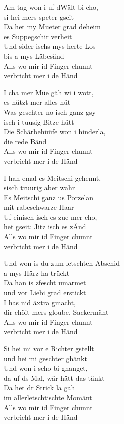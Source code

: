 \documentclass[
  letterpaper,
]{scrbook}
\begin{document}
Am tag won i uf d\textquotesingle Wält bi cho,\\
si hei mers speter gseit\\
Da het my Mueter grad deheim\\
es Suppegschir verheit\\
Und sider ischs mys herte Los\\
bis a mys Läbesänd\\
Alls wo mir id Finger chunnt\\
verbricht mer i de Händ

I cha mer Müe gäh wi i wott,\\
es nützt mer alles nüt\\
Was geschter no isch ganz gsy\\
isch i tuusig Bitze hütt\\
Die Schärbehüüfe won i hinderla,\\
die rede Bänd\\
Alls wo mir id Finger chunnt\\
verbricht mer i de Händ

I han emal es Meitschi gchennt,\\
s\textquotesingle isch truurig aber wahr\\
Es Meitschi ganz us Porzelan\\
mit rabeschwarze Haar\\
Uf einisch isch es zue mer cho,\\
het gseit: Jitz isch es z\textquotesingle Änd\\
Alls wo mir id Finger chunnt\\
verbricht mer i de Händ

Und won i\textquotesingle s du zum letschten Abschid\\
a mys Härz ha trückt\\
Da han i\textquotesingle s z\textquotesingle fescht umarmet\\
und vor Liebi grad erstickt\\
I has nid äxtra gmacht,\\
dir chöit mers gloube, Sackermänt\\
Alls wo mir id Finger chunnt\\
verbricht mer i de Händ

Si hei mi vor e Richter gstellt\\
und hei mi geschter ghänkt\\
Und won i scho bi ghanget,\\
da uf ds Mal, wär hätt das tänkt\\
Da het dr Strick la gah\\
im allerletschtischte Momänt\\
Alls wo mir id Finger chunnt\\
verbricht mer i de Händ
\end{document}
